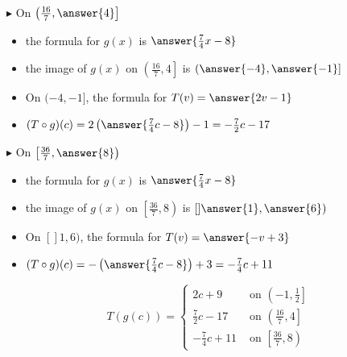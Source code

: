 \documentclass{ximera}
\begin{document}
$\blacktriangleright$ On $\left( \frac{16}{7}, \answer{4} \right]$



\begin{itemize}

\item the formula for $g(x)$ is $\answer{\frac{7}{4}x - 8}$
\item the image of $g(x)$ on $\left( \frac{16}{7}, 4 \right]$ is $\left( \answer{-4}, \answer{-1} \right]$
\item On $( -4, -1 ]$, the formula for $T(v) = \answer{2v-1}$  \\
\item $(T \circ g)(c) = 2\left(\answer{\frac{7}{4}c - 8}\right) - 1 = -\frac{7}{2}c - 17$ \\


\end{itemize}












$\blacktriangleright$ On $\left[ \frac{36}{7}, \answer{8} \right)$



\begin{itemize}

\item the formula for $g(x)$ is $\answer{\frac{7}{4}x - 8}$
\item the image of $g(x)$ on $\left[ \frac{36}{7}, 8 \right)$ is $\left[] \answer{1}, \answer{6} \right)$
\item On $[] 1, 6 )$, the formula for $T(v) = \answer{-v + 3}$  \\
\item $(T \circ g)(c) = -\left(\answer{\frac{7}{4}c - 8}\right) + 3 = -\frac{7}{4}c + 11$ \\


\end{itemize}

































\[
T(g(c)) = 
\begin{cases}
  2c +9                &       \text{ on }     \left(-1, \frac{1}{2}\right] \\
  \frac{7}{2}c - 17     &     \text{ on }  \left(\frac{16}{7}, 4\right] \\
  -\frac{7}{4}c + 11   &     \text{ on }  \left[\frac{36}{7}, 8\right)
\end{cases}
\]


  
\end{document}
